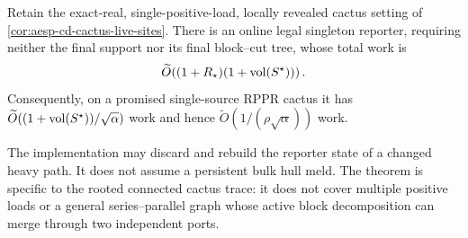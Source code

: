\begin{theorem}
\label{thm:aesp-cd-cactus-online-hysteretic-hld}
Retain the exact-real, single-positive-load, locally revealed cactus setting
of \cref{cor:aesp-cd-cactus-live-sites}.  There is an online legal singleton
reporter, requiring neither the final support nor its final block--cut tree,
whose total work is
\begin{equation}
 \widetilde O\!\left(
   (1+R_\star)(1+\operatorname{vol}(S^\star))
 \right).
 \label{eq:aesp-cd-cactus-online-hysteretic-hld-work}
\end{equation}
Consequently, on a promised single-source RPPR cactus it has
$\widetilde O((1+\operatorname{vol}(S^\star))/\sqrt\alpha)$ work and hence
$\widetilde O(1/(\rho\sqrt\alpha))$ work.

The implementation may discard and rebuild the reporter state of a changed
heavy path.  It does not assume a persistent bulk hull meld.  The theorem is
specific to the rooted connected cactus trace: it does not cover multiple
positive loads or a general series--parallel graph whose active block
decomposition can merge through two independent ports.
\end{theorem}

